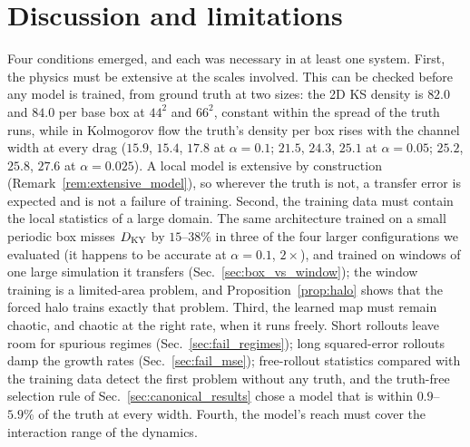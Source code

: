 \section{Discussion and limitations}
\label{sec:discussion}

 Four conditions emerged, and each was
necessary in at least one system. First, the physics must be extensive
at the scales involved. This can be checked before any model is trained,
from ground truth at two sizes: the 2D KS density is $82.0$ and $84.0$ per
base box at $44^2$ and $66^2$, constant within the spread of the truth runs,
while in Kolmogorov flow the truth's density per box rises with the
channel width at every drag ($15.9$, $15.4$, $17.8$ at $\alpha=0.1$; $21.5$, $24.3$,
$25.1$ at $\alpha=0.05$; $25.2$, $25.8$, $27.6$ at $\alpha=0.025$). A local model is
extensive by construction (Remark~\ref{rem:extensive_model}), so wherever
the truth is not, a transfer error is expected and is not a failure of
training. Second, the training data must contain the local statistics of
a large domain. The same architecture trained on a small periodic box
misses $D_{\mathrm{KY}}$ by $15$--$38\%$ in three of the four larger configurations we
evaluated (it happens to be accurate at $\alpha=0.1$, $2\times$), and trained on
windows of one large simulation it transfers (Sec.~\ref{sec:box_vs_window}); the window
training is a limited-area problem, and Proposition~\ref{prop:halo} shows
that the forced halo trains exactly that problem. Third, the learned map
must remain chaotic, and chaotic at the right rate, when it runs freely.
Short rollouts leave room for spurious regimes
(Sec.~\ref{sec:fail_regimes}); long squared-error rollouts damp the growth
rates (Sec.~\ref{sec:fail_mse}); free-rollout statistics compared with the
training data detect the first problem without any truth, and the
truth-free selection rule of Sec.~\ref{sec:canonical_results} chose a
model that is within $0.9$--$5.9\%$ of the truth at every width. Fourth, the
model's reach must cover the interaction range of the dynamics.

